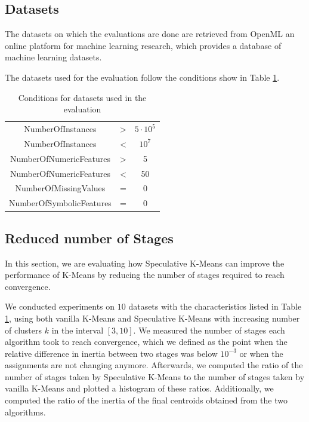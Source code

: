\subsection{Datasets}

The datasets on which the evaluations are done are retrieved from OpenML an online platform for machine learning research, which provides a database of machine learning datasets.

The datasets used for the evaluation follow the conditions show in Table \ref{table:conditions}.
\begin{table}[h]
\centering
\begin{tabular}{|c | c|  c|}
\hline
NumberOfInstances & > &  $5\cdot 10^5$\\
NumberOfInstances & < &  $10^7$ \\
NumberOfNumericFeatures & > & 5 \\
NumberOfNumericFeatures & < & 50 \\
NumberOfMissingValues & = & 0 \\
NumberOfSymbolicFeatures & = & 0 \\
\hline
\end{tabular}

\caption{Conditions for datasets used in the evaluation}
\label{table:conditions}
\end{table}

\subsection{Reduced number of Stages}
\label{section:evaluation_reduced_stages}
In this section, we are evaluating how Speculative K-Means can improve the performance of K-Means by reducing the number of stages required to reach convergence.

We conducted experiments on $10$ datasets with the characteristics listed in Table \ref{table:conditions}, using both vanilla K-Means and Speculative K-Means with increasing number of clusters $k$ in the interval $[3,10]$. We measured the number of stages each algorithm took to reach convergence, which we defined as the point when the relative difference in inertia between two stages was below $10^{-3}$ or when the assignments are not changing anymore. Afterwards, we computed the ratio of the number of stages taken by Speculative K-Means to the number of stages taken by vanilla K-Means and plotted a histogram of these ratios. Additionally, we computed the ratio of the inertia of the final centroids obtained from the two algorithms.

